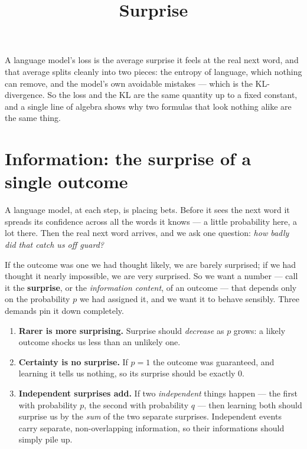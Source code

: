 \documentclass[11pt]{article}
\title{\color{inkblue}\bfseries Surprise}
\author{}
\date{}
\begin{document}
\maketitle
\thispagestyle{empty}

\begin{summary}
A language model's loss is the average surprise it feels at the real next word,
and that average splits cleanly into two pieces: the entropy of language, which nothing can
remove, and the model's own avoidable mistakes --- which is the KL-divergence. So the loss and
the KL are the same quantity up to a fixed constant, and a single line of algebra shows why two
formulas that look nothing alike are the same thing.
\end{summary}

\section{Information: the surprise of a single outcome}

A language model, at each step, is placing bets. Before it sees the next word it spreads its
confidence across all the words it knows --- a little probability here, a lot there. Then the
real next word arrives, and we ask one question: \emph{how badly did that catch us off guard?}

If the outcome was one we had thought likely, we are barely surprised; if we had thought it
nearly impossible, we are very surprised. So we want a number --- call it the \textbf{surprise},
or the \emph{information content}, of an outcome --- that depends only on the probability $p$ we
had assigned it, and we want it to behave sensibly. Three demands pin it down completely.
\begin{enumerate}[leftmargin=1.6em]
  \item \textbf{Rarer is more surprising.} Surprise should \emph{decrease} as $p$ grows: a likely
  outcome shocks us less than an unlikely one.
  \item \textbf{Certainty is no surprise.} If $p = 1$ the outcome was guaranteed, and learning it
  tells us nothing, so its surprise should be exactly $0$.
  \item \textbf{Independent surprises add.} If two \emph{independent} things happen --- the first
  with probability $p$, the second with probability $q$ --- then learning both should surprise us
  by the \emph{sum} of the two separate surprises. Independent events carry separate,
  non-overlapping information, so their informations should simply pile up.
\end{enumerate}
\end{document}
